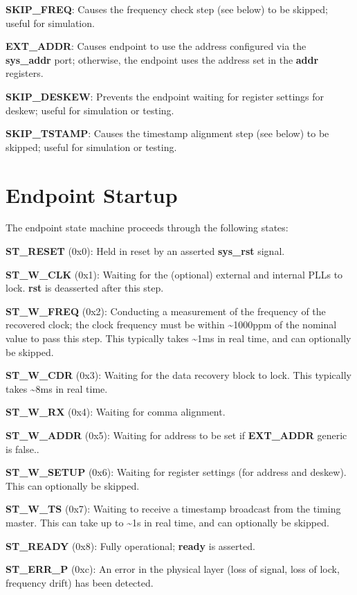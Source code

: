\documentclass[fleqn,12pt,a4paper]{olplainarticle}
\begin{document}
\textbf{SKIP\_FREQ}: Causes the frequency check step (see below) to be skipped; useful for simulation.

\textbf{EXT\_ADDR}: Causes endpoint to use the address configured via the \textbf{sys\_addr} port; otherwise, the endpoint uses the address set in the \textbf{addr} registers.

\textbf{SKIP\_DESKEW}: Prevents the endpoint waiting for register settings for deskew; useful for simulation or testing.

\textbf{SKIP\_TSTAMP}: Causes the timestamp alignment step (see below) to be skipped; useful for simulation or testing.

\section{Endpoint Startup}

The endpoint state machine proceeds through the following states:


\textbf{ST\_RESET} (0x0): Held in reset by an asserted \textbf{sys\_rst} signal.

\textbf{ST\_W\_CLK} (0x1): Waiting for the (optional) external and internal PLLs to lock. \textbf{rst} is deasserted after this step.

\textbf{ST\_W\_FREQ} (0x2): Conducting a measurement of the frequency of the recovered clock; the clock frequency must be within \textasciitilde{}1000ppm of the nominal value to pass this step. This typically takes \textasciitilde{}1ms in real time, and can optionally be skipped.

\textbf{ST\_W\_CDR} (0x3): Waiting for the data recovery block to lock. This typically takes \textasciitilde{}8ms in real time.

\textbf{ST\_W\_RX} (0x4): Waiting for comma alignment.

\textbf{ST\_W\_ADDR} (0x5): Waiting for address to be set if \textbf{EXT\_ADDR} generic is false..

\textbf{ST\_W\_SETUP} (0x6): Waiting for register settings (for address and deskew). This can optionally be skipped.

\textbf{ST\_W\_TS} (0x7): Waiting to receive a timestamp broadcast from the timing master. This can take up to \textasciitilde{}1s in real time, and can optionally be skipped.

\textbf{ST\_READY} (0x8): Fully operational; \textbf{ready} is asserted.

\textbf{ST\_ERR\_P} (0xc): An error in the physical layer (loss of signal, loss of lock, frequency drift) has been detected.
\end{document}
